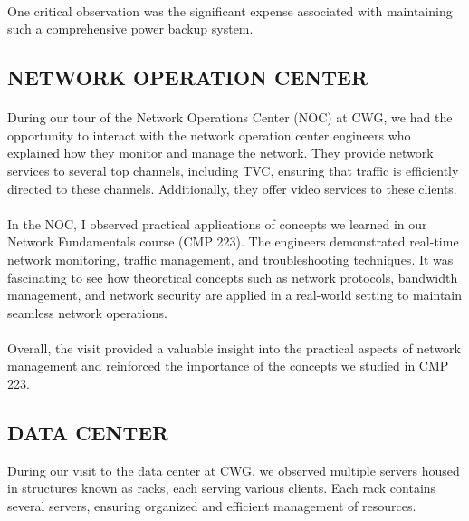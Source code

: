 \documentclass[a4paper,12pt]{report}
\begin{document}
\paragraph{}
One critical observation was the significant expense associated with maintaining such a comprehensive power backup system.

\subsection[Network center]{NETWORK OPERATION CENTER}
\paragraph{}
During our tour of the Network Operations Center (NOC) at CWG, we had the opportunity to interact with the network operation center engineers who explained how they monitor and manage the network. They provide network services to several top channels, including TVC, ensuring that traffic is efficiently directed to these channels. Additionally, they offer video services to these clients.

\paragraph{}
In the NOC, I observed practical applications of concepts we learned in our Network Fundamentals course (CMP 223). The engineers demonstrated real-time network monitoring, traffic management, and troubleshooting techniques. It was fascinating to see how theoretical concepts such as network protocols, bandwidth management, and network security are applied in a real-world setting to maintain seamless network operations.

\paragraph{}
Overall, the visit provided a valuable insight into the practical aspects of network management and reinforced the importance of the concepts we studied in CMP 223.

\subsection[Data center]{DATA CENTER}
During our visit to the data center at CWG, we observed multiple servers housed in structures known as racks, each serving various clients. Each rack contains several servers, ensuring organized and efficient management of resources.
\end{document}

